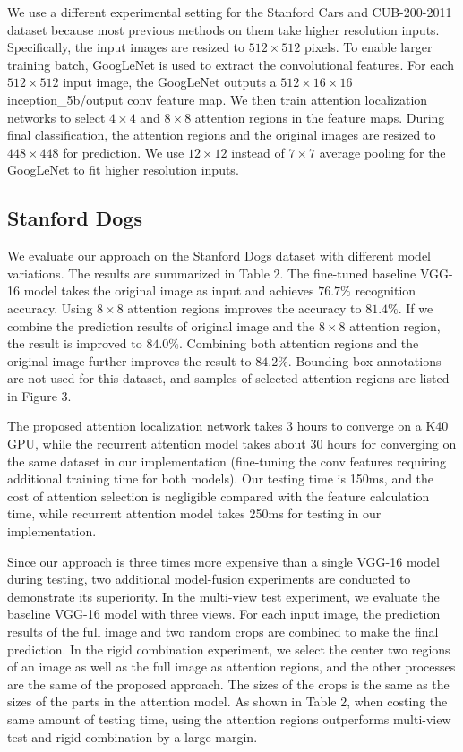\documentclass[runningheads]{llncs}
\begin{document}
We use a different experimental  setting for the Stanford Cars and CUB-200-2011 dataset because most previous methods on them take higher resolution inputs.
Specifically, the input images are resized to $512\times512$ pixels.
To enable larger training batch, GoogLeNet \cite{bd7}  is used to extract the convolutional features.
For each $512\times512$ input image, the GoogLeNet outputs a $512\times16\times16$ inception\_5b/output conv feature map.
We then train attention localization networks to select $4\times4$ and $8\times8$ attention regions in the feature maps.
During final classification, the attention regions and the original images are resized to $448\times448$ for prediction.
We use $12\times12$ instead of $7\times7$ average pooling for the GoogLeNet to fit higher resolution inputs.

\subsection{Stanford Dogs}
We evaluate our approach on the Stanford Dogs dataset with different model variations.
The results are summarized in Table 2.
The fine-tuned baseline VGG-16 model takes the original image as input and achieves $76.7\%$ recognition accuracy.
Using $8\times8$ attention regions improves the accuracy to $81.4\%$.
If we combine the prediction results of original image and the $8\times8$ attention region, the result is improved to $84.0\%$.
Combining both attention regions and the original image further improves the result to $84.2\%$.
Bounding box annotations are not used for this dataset, and samples of selected attention regions are listed in Figure 3.

The proposed attention localization network takes 3 hours to converge on a K40 GPU, while the recurrent attention model \cite{bd3} takes about 30 hours for converging on the same dataset in our implementation (fine-tuning the conv features requiring additional training time for both models). Our testing time is 150ms, and the cost of attention selection is negligible compared with the feature calculation time, while recurrent attention model \cite{bd3} takes 250ms for testing in our implementation.

Since our approach is three times more expensive than a single VGG-16 model during testing, two additional model-fusion experiments are conducted to demonstrate its superiority.
In the multi-view test experiment, we evaluate the baseline VGG-16 model with three views.
For each input image, the prediction results of the full image and two random crops are combined to make the final prediction.
In the rigid combination experiment, we select the center  two regions of an image as well as the full image as attention regions, and the other processes are the same of the proposed approach.
The sizes of the crops is the same as the sizes of the parts in the attention model.
As shown in Table 2, when costing the same amount of testing time, using the attention regions outperforms multi-view test and rigid combination by a large margin.
\end{document}

